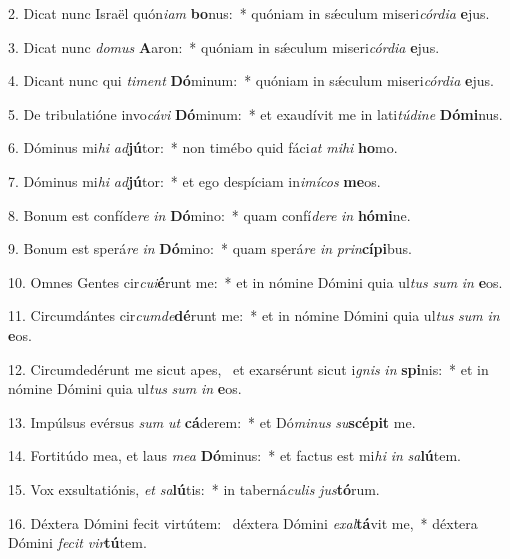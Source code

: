 2. Dicat nunc Israël quón\textit{i}\textit{am} \textbf{bo}nus:~*  quóniam in sǽculum miseri\textit{cór}\textit{di}\textit{a} \textbf{e}jus.\

3. Dicat nunc \textit{do}\textit{mus} \textbf{A}aron:~*  quóniam in sǽculum miseri\textit{cór}\textit{di}\textit{a} \textbf{e}jus.\

4. Dicant nunc qui \textit{ti}\textit{ment} \textbf{Dó}minum:~*  quóniam in sǽculum miseri\textit{cór}\textit{di}\textit{a} \textbf{e}jus.\

5. De tribulatióne invo\textit{cá}\textit{vi} \textbf{Dó}minum:~*  et exaudívit me in lati\textit{tú}\textit{di}\textit{ne} \textbf{Dó}\textbf{mi}nus.\

6. Dóminus mi\textit{hi} \textit{ad}\textbf{jú}tor:~*  non timébo quid fáci\textit{at} \textit{mi}\textit{hi} \textbf{ho}mo.\

7. Dóminus mi\textit{hi} \textit{ad}\textbf{jú}tor:~*  et ego despíciam in\textit{i}\textit{mí}\textit{cos} \textbf{me}os.\

8. Bonum est confíde\textit{re} \textit{in} \textbf{Dó}mino:~*  quam confí\textit{de}\textit{re} \textit{in} \textbf{hó}\textbf{mi}ne.\

9. Bonum est sperá\textit{re} \textit{in} \textbf{Dó}mino:~*  quam sperá\textit{re} \textit{in} \textit{prin}\textbf{cí}\textbf{pi}bus.\

10. Omnes Gentes cir\textit{cu}\textit{i}\textbf{é}runt me:~*  et in nómine Dómini quia ul\textit{tus} \textit{sum} \textit{in} \textbf{e}os.\

11. Circumdántes cir\textit{cum}\textit{de}\textbf{dé}runt me:~*  et in nómine Dómini quia ul\textit{tus} \textit{sum} \textit{in} \textbf{e}os.\

12. Circumdedérunt me sicut apes, \dag\  et exarsérunt sicut i\textit{gnis} \textit{in} \textbf{spi}nis:~*  et in nómine Dómini quia ul\textit{tus} \textit{sum} \textit{in} \textbf{e}os.\

13. Impúlsus evérsus \textit{sum} \textit{ut} \textbf{cá}derem:~*  et Dó\textit{mi}\textit{nus} \textit{su}\textbf{scé}\textbf{pit} me.\

14. Fortitúdo mea, et laus \textit{me}\textit{a} \textbf{Dó}minus:~*  et factus est mi\textit{hi} \textit{in} \textit{sa}\textbf{lú}tem.\

15. Vox exsultatiónis, \textit{et} \textit{sa}\textbf{lú}tis:~*  in taberná\textit{cu}\textit{lis} \textit{jus}\textbf{tó}rum.\

16. Déxtera Dómini fecit virtútem: \dag\  déxtera Dómini \textit{ex}\textit{al}\textbf{tá}vit me,~*  déxtera Dómini \textit{fe}\textit{cit} \textit{vir}\textbf{tú}tem.\

